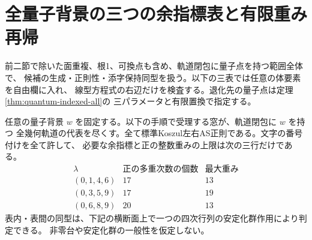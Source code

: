 \section{全量子背景の三つの余指標表と有限重み再帰}
\label{sec:quantum-universal-chambers}
前二節で除いた面重複、根1、可換点も含め、軌道閉包に量子点を持つ範囲全体で、
候補の生成・正則性・添字保持同型を扱う。以下の三表では任意の体要素を自由欄に入れ、
線型方程式の右辺だけを検査する。退化先の量子点は定理\ref{thm:quantum-indexed-all}の
三パラメータと有限置換で指定する。

\begin{theorem}\label{thm:quantum-universal-chambers}
任意の量子背景 $w$ を固定する。以下の手順で受理する窓が、軌道閉包に $w$ を持つ
全幾何軌道の代表を尽くす。全て標準Koszul左右AS正則である。文字の番号付けを全て許して、
必要な余指標と正の整数重みの上限は次の三行だけである。
\[
\begin{array}{c|c|c}
 \lambda & \text{正の多重次数の個数}&\text{最大重み}\\ \hline
 (0,1,4,6)&17&13\\
 (0,3,5,9)&17&19\\
 (0,6,8,9)&20&13
\end{array}
\]
表内・表間の同型は、下記の横断面上で一つの四次行列の安定化群作用により判定できる。
非零台や安定化群の一般性を仮定しない。
\end{theorem}
